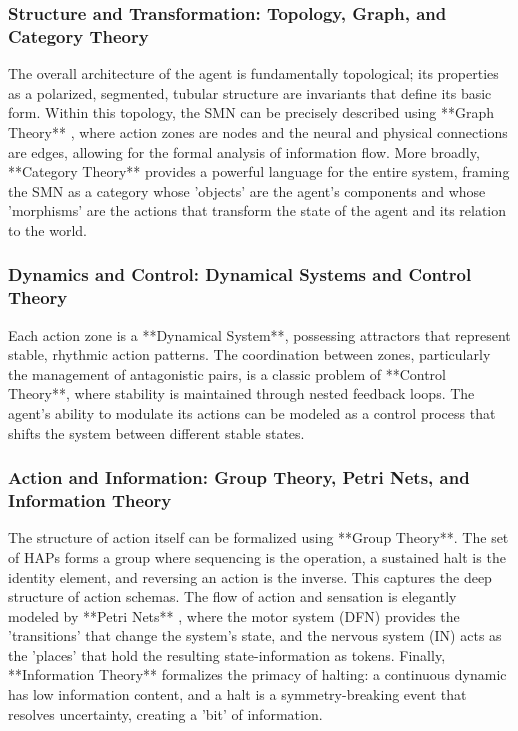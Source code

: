 \subsubsection{Structure and Transformation: Topology, Graph, and Category Theory}
\label{ssubsec:formal_structure}
The overall architecture of the agent is fundamentally topological; its properties as a polarized, segmented, tubular structure are invariants that define its basic form. Within this topology, the SMN can be precisely described using **Graph Theory** \cite{diestel2017graph}, where action zones are nodes and the neural and physical connections are edges, allowing for the formal analysis of information flow. More broadly, **Category Theory** \cite{spivak2014category} provides a powerful language for the entire system, framing the SMN as a category whose 'objects' are the agent's components and whose 'morphisms' are the actions that transform the state of the agent and its relation to the world.

\subsubsection{Dynamics and Control: Dynamical Systems and Control Theory}
\label{ssubsec:formal_dynamics}
Each action zone is a **Dynamical System**\cite{strogatz1994nonlinear}, possessing attractors that represent stable, rhythmic action patterns. The coordination between zones, particularly the management of antagonistic pairs, is a classic problem of **Control Theory**\cite{wiener1948cybernetics}, where stability is maintained through nested feedback loops. The agent's ability to modulate its actions can be modeled as a control process that shifts the system between different stable states.

\subsubsection{Action and Information: Group Theory, Petri Nets, and Information Theory}
\label{ssubsec:formal_action}
The structure of action itself can be formalized using **Group Theory**. The set of HAPs forms a group where sequencing is the operation, a sustained halt is the identity element, and reversing an action is the inverse. This captures the deep structure of action schemas. The flow of action and sensation is elegantly modeled by **Petri Nets** \cite{peterson1977petri}, where the motor system (DFN) provides the 'transitions' that change the system's state, and the nervous system (IN) acts as the 'places' that hold the resulting state-information as tokens. Finally, **Information Theory** \cite{shannon1948mathematical} formalizes the primacy of halting: a continuous dynamic has low information content, and a halt is a symmetry-breaking event that resolves uncertainty, creating a 'bit' of information.

